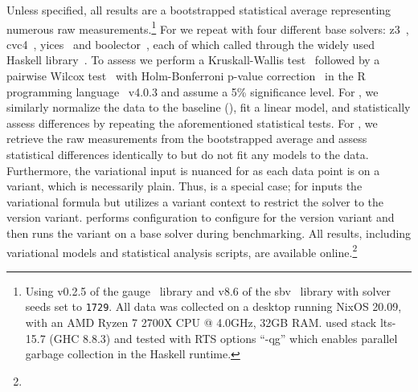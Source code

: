 Unless specified, all results are a bootstrapped statistical average
representing numerous raw measurements.\footnote{Using v0.2.5 of the
  gauge~\citep{gauge} library and v8.6 of the sbv~\citep{sbv} library with
    solver seeds set to \texttt{1729}. All data was collected on a desktop
    running NixOS 20.09, with an AMD Ryzen 7 2700X CPU @ 4.0GHz, 32GB RAM.\@We
    used stack lts-15.7 (GHC 8.8.3) and tested with RTS options ``-qg'' which
    enables parallel garbage collection in the Haskell runtime.}
%
  For  we repeat  with four different base solvers:
  z3~\cite{10.1007/978-3-540-78800-3_24},
  cvc4~\citep{10.1007/978-3-642-22110-1_14}, yices~\citep{Dutertre:cav2014} and
  boolector~\citep{DBLP:conf/tacas/BrummayerB09}, each of which called through
  the widely used Haskell library~\citep{sbv}. To assess  we perform a
  Kruskall-Wallis test~\citep{nist} followed by a pairwise Wilcox
  test~\citep{WilcoxonPairwise} with Holm-Bonferroni p-value
  correction~\citep{10.2307/4615733} in the R programming language~\citep{RLang}
  v4.0.3 and assume a 5\% significance level.
%
For , we similarly normalize the data to the baseline (\vTop{}), fit a
linear model, and statistically assess differences by repeating the
aforementioned statistical tests. For , we retrieve the raw measurements
from the bootstrapped average and assess statistical differences identically to
 but do not fit any models to the data. Furthermore, the variational
input is nuanced for  as each data point is on a variant, which is
necessarily plain. Thus,  is a special case; for  \vTov{} inputs
the variational formula but utilizes a variant context to restrict the solver to
the version variant. \vTop{} performs configuration to configure for the version
variant and then runs the variant on a base solver during benchmarking. All
results, including variational models and statistical analysis scripts, are
available online.\footnote{\github{}}

